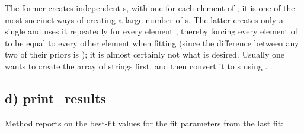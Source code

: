 \documentclass[letterpaper,10pt,english]{sphinxmanual}
\begin{document}
The former creates  independent s, with one for each element
of ; it is one of the most succinct ways of creating a large number of
s. The latter creates only a single  and uses it repeatedly for
every element , thereby forcing every element of   to be equal
to every other element when fitting (since the difference between any two of
their priors is ); it is almost certainly not what is desired.
Usually one wants to create the array of strings first, and then convert it to
s using .


\subsection{d) print\_results}
\label{corrfitter:id6}
Method  reports on the best-fit values
for the fit parameters from the last fit:
\end{document}
